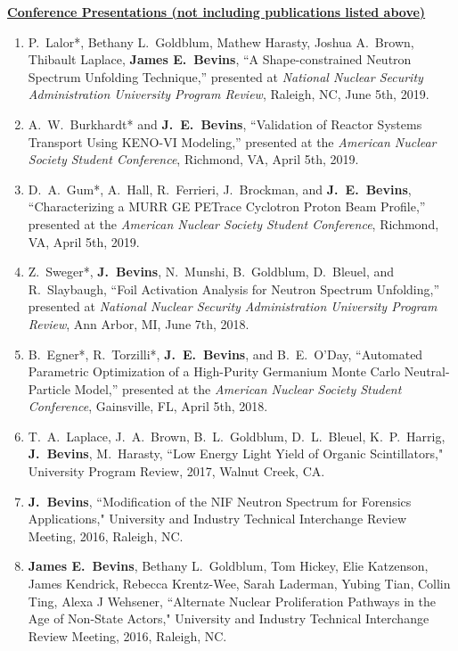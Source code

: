 \underline{\textbf{Conference Presentations (not including publications listed above)}}

\begin{enumerate}
  \item P.\ Lalor*, Bethany L.\ Goldblum, Mathew Harasty, Joshua A.\ Brown, Thibault Laplace,  \textbf{James E.\ Bevins}, ``A Shape-constrained Neutron Spectrum Unfolding Technique,” presented at \textit{National Nuclear Security Administration University Program Review}, Raleigh, NC, June 5th, 2019.

  \item A.\ W.\ Burkhardt* and \textbf{J.\ E.\ Bevins}, ``Validation of Reactor Systems Transport Using KENO-VI Modeling,” presented at the \textit{American Nuclear Society Student Conference}, Richmond, VA, April 5th, 2019.

  \item D.\ A.\ Gum*, A.\ Hall, R.\ Ferrieri, J.\ Brockman, and \textbf{J.\ E.\ Bevins}, ``Characterizing a MURR GE PETrace Cyclotron Proton Beam Profile,” presented at the \textit{American Nuclear Society Student Conference}, Richmond, VA, April 5th, 2019.

  \item Z.\ Sweger*, \textbf{J.\ Bevins}, N.\ Munshi, B.\ Goldblum, D.\ Bleuel, and R.\ Slaybaugh, ``Foil Activation Analysis for Neutron Spectrum Unfolding,” presented at \textit{National Nuclear Security Administration University Program Review}, Ann Arbor, MI, June 7th, 2018.

  \item B.\ Egner*, R.\ Torzilli*, \textbf{J.\ E.\ Bevins}, and B.\ E.\ O’Day, ``Automated Parametric Optimization of a High-Purity Germanium Monte Carlo Neutral-Particle Model,” presented at the \textit{American Nuclear Society Student Conference}, Gainsville, FL, April 5th, 2018.

  \item T.\ A.\ Laplace, J.\ A.\ Brown, B.\ L.\ Goldblum, D.\ L.\ Bleuel, K.\ P.\ Harrig, \textbf{J.\ Bevins}, M.\ Harasty, ``Low Energy Light Yield of Organic Scintillators," University Program Review, 2017, Walnut Creek, CA.
  
  \item \textbf{J.\ Bevins}, ``Modification of the NIF Neutron Spectrum for Forensics Applications," University and Industry Technical Interchange Review Meeting, 2016, Raleigh, NC.
  
  \item \textbf{James E.\ Bevins}, Bethany L.\ Goldblum, Tom Hickey, Elie Katzenson, James Kendrick, Rebecca Krentz-Wee, Sarah Laderman, Yubing Tian, Collin Ting, Alexa J Wehsener, ``Alternate Nuclear Proliferation Pathways in the Age of Non-State Actors," University and Industry Technical Interchange Review Meeting, 2016, Raleigh, NC.


\end{enumerate}
